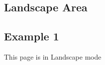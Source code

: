 \begin{landscape}
\chapter{Landscape Area}
\section{Example 1}
This page is in Landscape mode
\end{landscape}
